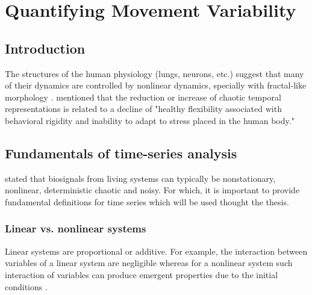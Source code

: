 
\chapter{Quantifying Movement Variability}

%


\section{Introduction}


The structures of the human physiology (lungs, neurons, etc.) suggest that many of 
their dynamics are controlled by nonlinear dynamics, specially with fractal-like
morphology \cite{goldberger1990}. 
\cite{stergiou2006} mentioned that the reduction or increase of chaotic
temporal representations is related to a decline of 
"healthy flexibility associated with behavioral rigidity and inability 
to adapt to stress placed in the human body." 


\section{Fundamentals of time-series analysis}

\citep{klonowski2007, caballero2014, wijnants2009, gomezgarcia2014} stated that biosignals 
from living systems can typically be nonstationary, nonlinear, deterministic chaotic and noisy.
For which, it is important to provide fundamental definitions for time series
which will be used thought the thesis.

\subsection{Linear vs. nonlinear systems}
Linear systems are proportional or additive. For example, the interaction between 
variables of a linear system are negligible whereas for a nonlinear system such interaction
of variables can produce emergent properties due to the initial conditions \citep{klonowski2007}.

